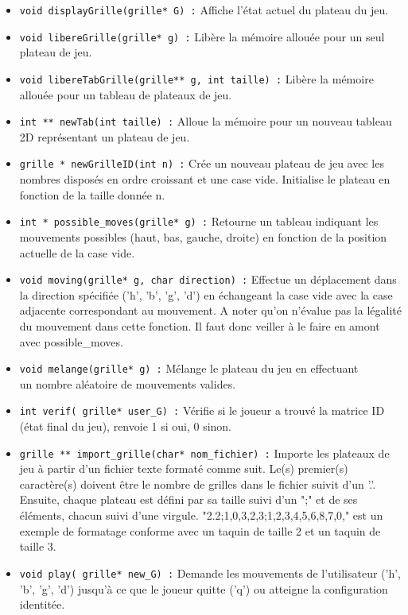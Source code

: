 \documentclass{article}
\begin{document}
\begin{itemize}
 \item \texttt{void displayGrille(grille* G) :} Affiche l'état actuel du plateau du jeu.
 \item \texttt{void libereGrille(grille* g) :} Libère la mémoire allouée pour un seul plateau de jeu.
 \item \texttt{void libereTabGrille(grille** g, int taille) :} Libère la mémoire allouée pour un tableau de plateaux de jeu.
 \item \texttt{int ** newTab(int taille) :} Alloue la mémoire pour un nouveau tableau 2D représentant un plateau de jeu.
 \item \texttt{grille * newGrilleID(int n) :} Crée un nouveau plateau de jeu avec les nombres disposés en ordre croissant et une case vide. Initialise le plateau en fonction de la taille donnée n.
 \item \texttt{int * possible\_moves(grille* g) :} Retourne un tableau indiquant les mouvements possibles (haut, bas, gauche, droite) en fonction de la position actuelle de la case vide.
 \item \texttt{void moving(grille* g, char direction) :} Effectue un déplacement dans la direction spécifiée ('h', 'b', 'g', 'd') en échangeant la case vide avec la case adjacente correspondant au mouvement. A noter qu'on n'évalue pas la légalité du mouvement dans cette fonction. Il faut donc veiller à le faire en amont avec possible\_moves.
 \item \texttt{void melange(grille* g) :} Mélange le plateau du jeu en effectuant\\ un nombre aléatoire de mouvements valides.
 \item \texttt{int verif( grille* user\_G) :} Vérifie si le joueur a trouvé la matrice ID (état final du jeu), renvoie 1 si oui, 0 sinon.
 \item \texttt{grille ** import\_grille(char* nom\_fichier) :} Importe les plateaux de jeu à partir d'un fichier texte formaté comme suit. Le(s) premier(s) caractère(s) doivent être le nombre de grilles dans le fichier suivit d'un '.'. Ensuite, chaque plateau est défini par sa taille suivi d'un ";" et  de ses éléments, chacun suivi d'une virgule.
 "2.2;1,0,3,2,3;1,2,3,4,5,6,8,7,0," est un exemple de formatage conforme avec un taquin de taille 2 et un taquin de taille 3.
 \item \texttt{void play( grille* new\_G) :} Demande les mouvements de l'utilisateur ('h', 'b', 'g', 'd') jusqu'à ce que le joueur quitte ('q') ou atteigne la configuration identitée.

\end{itemize}
\end{document}
